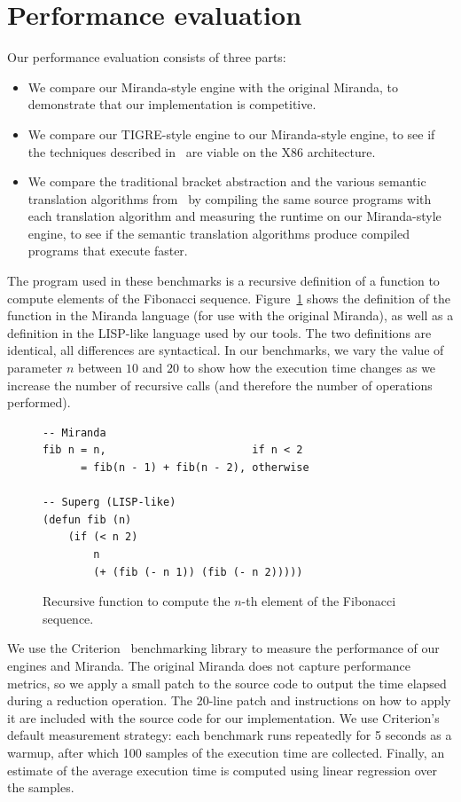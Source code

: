 \documentclass[conference]{IEEEtran}
\begin{document}
\section{Performance evaluation}
\label{sec:eval}
Our performance evaluation consists of three parts:
\begin{itemize}
    \item We compare our Miranda-style engine with the original Miranda, to demonstrate that our implementation is competitive.
    \item We compare our TIGRE-style engine to our Miranda-style engine, to see if the techniques described in~\cite{koopman_fresh_1989} are viable on the X86 architecture.
    \item We compare the traditional bracket abstraction and the various semantic translation algorithms from~\cite{kiselyov_lambda_2018} by compiling the same source programs with each translation algorithm and measuring the runtime on our Miranda-style engine, to see if the semantic translation algorithms produce compiled programs that execute faster.
\end{itemize}

The program used in these benchmarks is a recursive definition of a function to compute elements of the Fibonacci sequence.
Figure~\ref{fig:fib} shows the definition of the function in the Miranda language (for use with the original Miranda), as well as a definition in the LISP-like language used by our tools.
The two definitions are identical, all differences are syntactical.
In our benchmarks, we vary the value of parameter $n$ between $10$ and $20$ to show how the execution time changes as we increase the number of recursive calls (and therefore the number of operations performed).

\begin{figure}
    \begin{lstlisting}
-- Miranda
fib n = n,                       if n < 2
      = fib(n - 1) + fib(n - 2), otherwise

-- Superg (LISP-like)
(defun fib (n)
    (if (< n 2) 
        n
        (+ (fib (- n 1)) (fib (- n 2)))))
    \end{lstlisting}
    \centering
    \caption{
        Recursive function to compute the $n$-th element of the Fibonacci sequence.
    }
    \label{fig:fib}
\end{figure}

We use the Criterion~\cite{heisler_criterionrs_2023} benchmarking library to measure the performance of our engines and Miranda.
The original Miranda does not capture performance metrics, so we apply a small patch to the source code to output the time elapsed during a reduction operation.
The 20-line patch and instructions on how to apply it are included with the source code for our implementation.
We use Criterion's default measurement strategy: each benchmark runs repeatedly for 5 seconds as a warmup, after which 100 samples of the execution time are collected.
Finally, an estimate of the average execution time is computed using linear regression over the samples.
\end{document}
